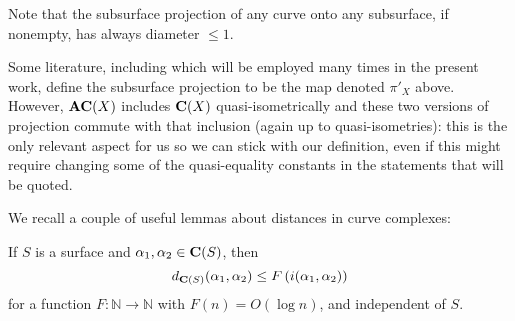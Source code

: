Note that the subsurface projection of any curve onto any subsurface, if nonempty, has always diameter $\leq 1$.

Some literature, including \cite{mms} which will be employed many times in the present work, define the subsurface projection to be the map denoted $\pi'_X$ above. However, $\mathbf{AC}(X)$ includes $\mathbf C(X)$ quasi-isometrically and these two versions of projection commute with that inclusion (again up to quasi-isometries): this is the only relevant aspect for us so we can stick with our definition, even if this might require changing some of the quasi-equality constants in the statements that will be quoted.

We recall a couple of useful lemmas about distances in curve complexes:

\begin{lemma}\label{lem:cc_distance}
If $S$ is a surface and $\alpha_1,\alpha_2\in \mathbf C(S)$, then
$$
d_{\mathbf C(S)}(\alpha_1,\alpha_2)\leq F\left(i(\alpha_1,\alpha_2)\right)
$$
for a function $F:\mathbb N\rightarrow\mathbb N$ with $F(n)=O(\log n)$, and independent of $S$.
\end{lemma}

